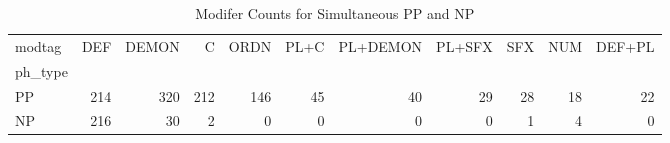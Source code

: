 \begin{table}[htbp!]
\centering
\caption{Modifer Counts for Simultaneous PP and NP}
\label{table:simmod_ct}
\begin{adjustbox}{width=1\textwidth}
\begin{tabular}{lrrrrrrrrrr}
\toprule
modtag &  DEF &  DEMON &    C &  ORDN &  PL+C &  PL+DEMON &  PL+SFX &  SFX &  NUM &  DEF+PL \\
ph\_type &      &        &      &       &       &           &         &      &      &         \\
\midrule
PP      &  214 &    320 &  212 &   146 &    45 &        40 &      29 &   28 &   18 &      22 \\
NP      &  216 &     30 &    2 &     0 &     0 &         0 &       0 &    1 &    4 &       0 \\
\bottomrule
\end{tabular}
\end{adjustbox}
\end{table}
